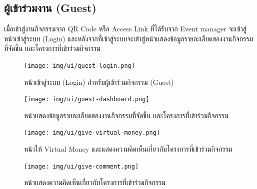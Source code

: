 \subsection{ผู้เข้าร่วมงาน (Guest)}
เมื่อเข้าสู่งานกิจกรรมจาก QR Code หรือ Access Link ที่ได้รับจาก Event manager จะเข้าสู่หน้าเข้าสู่ระบบ (Login) และหลังจากที่เข้าสู่ระบบจะเข้าสู่หน้าแสดงข้อมูลรายละเอียดของงานกิจกรรมที่จัดขึ้น และโครงการที่เข้าร่วมกิจกรรม
\begin{figure}[h]
    \begin{center}
        \texttt{[image: img/ui/guest-login.png]}
    \end{center}
    \caption{หน้าเข้าสู่ระบบ (Login) สำหรับผู้เข้าร่วมกิจกรรม (Guest)}
    \label{fig:guest-dashboard}

    \begin{center}
        \texttt{[image: img/ui/guest-dashboard.png]}
    \end{center}
    \caption{หน้าแสดงข้อมูลรายละเอียดของงานกิจกรรมที่จัดขึ้น และโครงการที่เข้าร่วมกิจกรรม}
    \label{fig:guest-dashboard}
\end{figure}

\begin{figure}
    \begin{center}
        \texttt{[image: img/ui/give-virtual-money.png]}
    \end{center}
    \caption{หน้าให้ Virtual Money และแสดงความคิดเห็นเกี่ยวกับโครงการที่เข้าร่วมกิจกรรม}
    \label{fig:guest-project-info}

    \begin{center}
        \texttt{[image: img/ui/give-comment.png]}
    \end{center}
    \caption{หน้าแสดงความคิดเห็นเกี่ยวกับโครงการที่เข้าร่วมกิจกรรม}
    \label{fig:give-comment}
\end{figure}